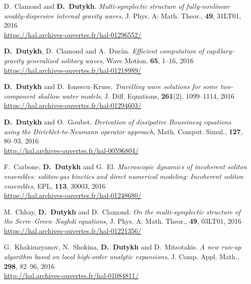 \begin{etaremune}
  \item D.~Clamond and \textbf{D.~Dutykh}. \textit{Multi-symplectic structure of fully-nonlinear weakly-dispersive internal gravity waves}, J. Phys. A: Math. Theor., \textbf{49}, 31LT01, 2016 \\ %
  \url{https://hal.archives-ouvertes.fr/hal-01296552/}

  \item \textbf{D.~Dutykh}, D.~Clamond and A.~Dur\'an. \textit{Efficient computation of capillary-gravity generalized solitary waves}, Wave Motion, \textbf{65}, 1--16, 2016 \\ %
  \url{https://hal.archives-ouvertes.fr/hal-01218989/}
  
  \item \textbf{D.~Dutykh} and D.~Ionescu--Kruse. \textit{Travelling wave solutions for some two-component shallow water models}, J. Diff. Equations, \textbf{261}(2), 1099--1114, 2016 \\ %
  \url{https://hal.archives-ouvertes.fr/hal-01294603/}
  
  \item \textbf{D.~Dutykh} and O.~Goubet. \textit{Derivation of dissipative Boussinesq equations using the Dirichlet-to-Neumann operator approach}, Math. Comput. Simul., \textbf{127}, 80--93, 2016 \\ %
  \url{http://hal.archives-ouvertes.fr/hal-00596804/}
  
  \item F.~Carbone, \textbf{D.~Dutykh} and G.~El. \textit{Macroscopic dynamics of incoherent soliton ensembles: soliton-gas kinetics and direct numerical modeling: Incoherent soliton ensembles}, EPL, \textbf{113}, 30003, 2016 \\ %
  \url{https://hal.archives-ouvertes.fr/hal-01248680/}
  
  \item M.~Chhay, \textbf{D.~Dutykh} and D.~Clamond. \textit{On the multi-symplectic structure of the Serre--Green--Naghdi equations}, J. Phys. A: Math. Theor., \textbf{49}, 03LT01, 2016 \\ %
  \url{https://hal.archives-ouvertes.fr/hal-01221356/}
  
  \item G.~Khakimzyanov, N.~Shokina, \textbf{D.~Dutykh} and D.~Mitsotakis. \textit{A new run-up algorithm based on local high-order analytic expansions}, J. Comp. Appl. Math., \textbf{298}, 82--96, 2016 \\ %
  \url{http://hal.archives-ouvertes.fr/hal-01084811/}
  

\end{etaremune}
